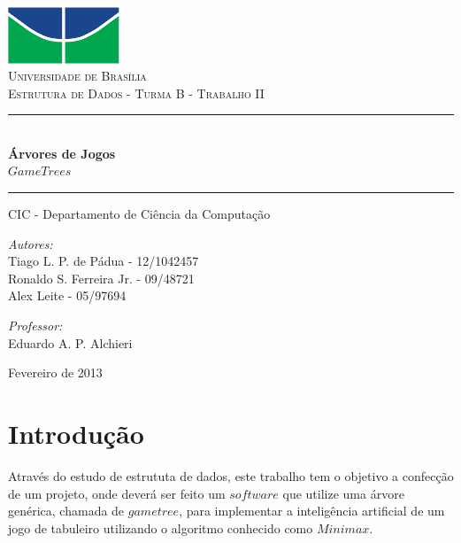 \documentclass[a4paper,11pt]{article}
\newcommand{\HRule}{\rule{\linewidth}{0.5mm}}
\begin{document}
\begin{titlepage}
\begin{center}
 
\includegraphics[width=0.25\textwidth]{./unb.pdf}\\[1cm]
 
\textsc{\LARGE Universidade de Brasília}\\[1.5cm]
 
\textsc{\Large Estrutura de Dados - Turma B - Trabalho II}\\[0.5cm]
 
\HRule \\[0.4cm]
{ \huge \bfseries Árvores de Jogos\\$Game Trees$}
\HRule
\vspace{0.75cm}
\large CIC - Departamento de Ciência da Computação\\
\vspace{0.8cm}
\begin{minipage}{0.4\textwidth}
\begin{flushleft} \large
\emph{Autores:}\\
Tiago L. P. de Pádua - 12/1042457\\
Ronaldo S. Ferreira Jr. - 09/48721\\
Alex Leite - 05/97694\\
\end{flushleft}
\end{minipage}
\begin{minipage}{0.4\textwidth}
\begin{flushright} \large
\emph{Professor:} \\
Eduardo A. P. Alchieri
\end{flushright}
\end{minipage}
 
\vfill
 
{\large Fevereiro de 2013}
\end{center}
\end{titlepage}

\pagestyle{plain}

\section{Introdução} 
Através do estudo de estrututa de dados, este trabalho tem o objetivo a confecção de um projeto, onde deverá ser feito um $software$ que utilize uma  árvore genérica, chamada de $game tree$, para implementar a inteligência artificial de um jogo de tabuleiro utilizando o algoritmo conhecido como $Minimax$.
\end{document}

